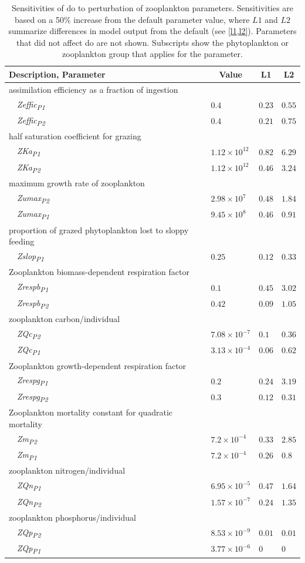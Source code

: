 \documentclass[letterpaper,12pt,oneside]{article}\usepackage[]{graphicx}\usepackage[]{color}
\begin{document}
\begin{table}[!tbp]
{\normalsize
\caption{Sensitivities of \ac{do} to perturbation of zooplankton parameters.  Sensitivities are based on a 50\% increase from the default parameter value, where $L1$ and $L2$ summarize differences in model output from the default (see \cref{l1,l2}).  Parameters that did not affect \ac{do} are not shown.  Subscripts show the phytoplankton or zooplankton group that applies for the parameter.\label{tab:zoopsens}} 
\begin{center}
\begin{tabular}{llll}
\hline\hline
\multicolumn{1}{l}{Description, Parameter}&\multicolumn{1}{c}{Value}&\multicolumn{1}{c}{L1}&\multicolumn{1}{c}{L2}\tabularnewline
\hline
{assimilation efficiency as a fraction of ingestion}&&&\tabularnewline
~~\textit{Zeffic\textsubscript{P1}}&$0.4$&$0.23$&$0.55$\tabularnewline
~~\textit{Zeffic\textsubscript{P2}}&$0.4$&$0.21$&$0.75$\tabularnewline
\hline
{half saturation coefficient for grazing}&&&\tabularnewline
~~\textit{ZKa\textsubscript{P1}}&$1.12\times 10^{12}$&$0.82$&$6.29$\tabularnewline
~~\textit{ZKa\textsubscript{P2}}&$1.12\times 10^{12}$&$0.46$&$3.24$\tabularnewline
\hline
{maximum growth rate of zooplankton}&&&\tabularnewline
~~\textit{Zumax\textsubscript{P2}}&$2.98\times 10^{7}$&$0.48$&$1.84$\tabularnewline
~~\textit{Zumax\textsubscript{P1}}&$9.45\times 10^{8}$&$0.46$&$0.91$\tabularnewline
\hline
{proportion of grazed phytoplankton lost to sloppy feeding}&&&\tabularnewline
~~\textit{Zslop\textsubscript{P1}}&$0.25$&$0.12$&$0.33$\tabularnewline
\hline
{Zooplankton biomass-dependent respiration factor}&&&\tabularnewline
~~\textit{Zrespb\textsubscript{P1}}&$0.1$&$0.45$&$3.02$\tabularnewline
~~\textit{Zrespb\textsubscript{P2}}&$0.42$&$0.09$&$1.05$\tabularnewline
\hline
{zooplankton carbon/individual}&&&\tabularnewline
~~\textit{ZQc\textsubscript{P2}}&$7.08\times 10^{-7}$&$0.1$&$0.36$\tabularnewline
~~\textit{ZQc\textsubscript{P1}}&$3.13\times 10^{-4}$&$0.06$&$0.62$\tabularnewline
\hline
{Zooplankton growth-dependent respiration factor}&&&\tabularnewline
~~\textit{Zrespg\textsubscript{P1}}&$0.2$&$0.24$&$3.19$\tabularnewline
~~\textit{Zrespg\textsubscript{P2}}&$0.3$&$0.12$&$0.31$\tabularnewline
\hline
{Zooplankton mortality constant for quadratic mortality}&&&\tabularnewline
~~\textit{Zm\textsubscript{P2}}&$7.2\times 10^{-4}$&$0.33$&$2.85$\tabularnewline
~~\textit{Zm\textsubscript{P1}}&$7.2\times 10^{-4}$&$0.26$&$0.8$\tabularnewline
\hline
{zooplankton nitrogen/individual}&&&\tabularnewline
~~\textit{ZQn\textsubscript{P1}}&$6.95\times 10^{-5}$&$0.47$&$1.64$\tabularnewline
~~\textit{ZQn\textsubscript{P2}}&$1.57\times 10^{-7}$&$0.24$&$1.35$\tabularnewline
\hline
{zooplankton phosphorus/individual}&&&\tabularnewline
~~\textit{ZQp\textsubscript{P2}}&$8.53\times 10^{-9}$&$0.01$&$0.01$\tabularnewline
~~\textit{ZQp\textsubscript{P1}}&$3.77\times 10^{-6}$&$0$&$0$\tabularnewline
\hline
\end{tabular}\end{center}}

\end{table}
\end{document}
